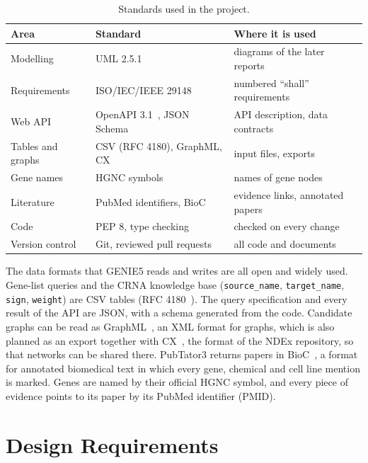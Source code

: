 \documentclass[11pt,a4paper]{article}
\renewcommand{\arraystretch}{1.25}
\newcommand{\gen}{GENIE5}
\newcommand{\code}[1]{\texttt{#1}}
\begin{document}
\begin{table}[htbp]
\centering
\small
\renewcommand{\arraystretch}{1.1}
\begin{tabular}{@{}lll@{}}
\toprule
\textbf{Area} & \textbf{Standard} & \textbf{Where it is used}\\
\midrule
Modelling & UML 2.5.1~\cite{uml} & diagrams of the later reports\\
Requirements & ISO/IEC/IEEE 29148~\cite{iso29148} & numbered ``shall'' requirements\\
Web API & OpenAPI 3.1~\cite{openapi}, JSON Schema & API description, data contracts\\
Tables and graphs & CSV (RFC 4180), GraphML, CX & input files, exports\\
Gene names & HGNC symbols~\cite{hgnc} & names of gene nodes\\
Literature & PubMed identifiers, BioC & evidence links, annotated papers\\
Code & PEP 8, type checking & checked on every change\\
Version control & Git, reviewed pull requests & all code and documents\\
\bottomrule
\end{tabular}
\caption{Standards used in the project.}
\end{table}

The data formats that \gen{} reads and writes are all open and widely used. Gene-list queries
and the CRNA knowledge base (\code{source\_name}, \code{target\_name}, \code{sign},
\code{weight}) are CSV tables (RFC 4180~\cite{rfc4180}). The query specification and every result
of the API are JSON, with a schema generated from the code. Candidate graphs can be read as
GraphML~\cite{graphml}, an XML format for graphs, which is also planned as an export together with
CX~\cite{ndex}, the format of the NDEx repository, so that networks can be shared there.
PubTator3 returns papers in BioC~\cite{bioc}, a format for annotated biomedical text in which every
gene, chemical and cell line mention is marked. Genes are named by their official HGNC symbol, and
every piece of evidence points to its paper by its PubMed identifier (PMID).


\section{Design Requirements}
\end{document}

